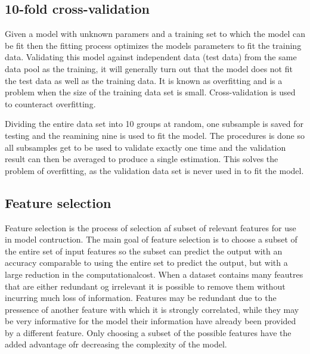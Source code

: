 \subsection{10-fold cross-validation}
Given a model with unknown paramers and a training set to which the model can be fit then the fitting process optimizes the models parameters to fit the training data. Validating this model against independent data (test data) from the same data pool as the training, it will generally turn out that the model does not fit the test data as well as the training data. It is known as overfitting and is a problem when the size of the training data set is small. Cross-validation is used to counteract overfitting.

Dividing the entire data set into 10 groups at random, one subsample is saved for testing and the reamining nine is used to fit the model. The procedures is done so all subsamples get to be used to validate exactly one time and the validation result can then be averaged to produce a single estimation. This solves the problem of overfitting, as the validation data set is never used in to fit the model.

\subsection{Feature selection}
Feature selection is the process of selection af subset of relevant features for use in model contruction.
The main goal of feature selection is to choose a subset of the entire set of input features so the subset can predict the output with an accuracy comparable to using the entire set to predict the output, but with a large reduction in the computationalcost. 
When a dataset contains many feautres that are either redundant og irrelevant it is possible to remove them without incurring much loss of information. Features may be redundant due to the pressence of another feature with which it is strongly correlated, while they may be very informative for the model their information have already been provided by a different feature. Only choosing a subset of the possible features have the added advantage ofr decreasing the complexity of the model.

